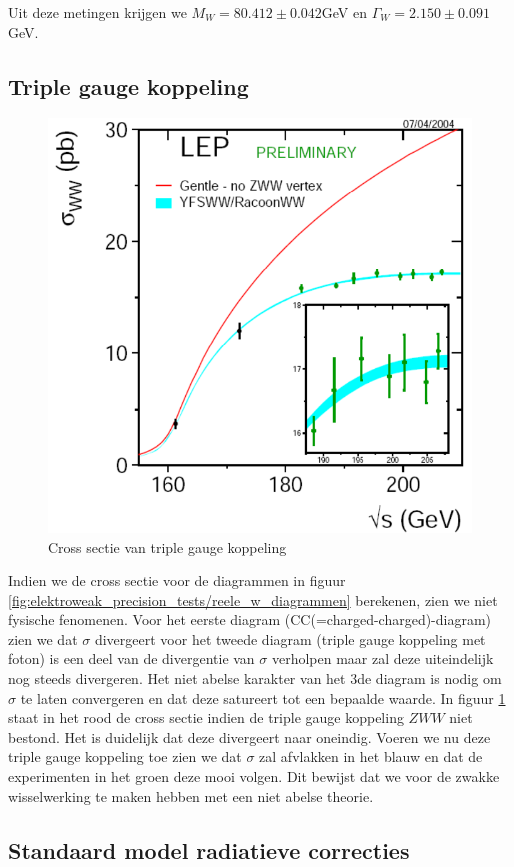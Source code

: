 \documentclass[../main.tex]{subfiles}
\begin{document}
Uit deze metingen krijgen we $M_W = 80.412 \pm 0.042$GeV en $\Gamma_W = 2.150 \pm 0.091$GeV.

\subsection{Triple gauge koppeling}%
\label{sub:triple_gauge_koppeling}

\begin{figure}[h]
    \centering
    \includegraphics[width=0.4\linewidth]{elektroweak_precision_tests/w_sigma_sat.png}
    \caption{Cross sectie van triple gauge koppeling}%
    \label{fig:elektroweak_precision_tests/w_sigma_sat}
\end{figure}

Indien we de cross sectie voor de diagrammen in figuur \ref{fig:elektroweak_precision_tests/reele_w_diagrammen} berekenen, zien we niet fysische fenomenen. Voor het eerste diagram (CC(=charged-charged)-diagram) zien we dat $\sigma$ divergeert voor het tweede diagram (triple gauge koppeling met foton) is een deel van de divergentie van $\sigma$ verholpen maar zal deze uiteindelijk nog steeds divergeren. Het niet abelse karakter van het 3de diagram is nodig om $\sigma$ te laten convergeren en dat deze satureert tot een bepaalde waarde. In figuur \ref{fig:elektroweak_precision_tests/w_sigma_sat} staat in het rood de cross sectie indien de triple gauge koppeling $ZWW$ niet bestond. Het is duidelijk dat deze divergeert naar oneindig. Voeren we nu deze triple gauge koppeling toe zien we dat $\sigma$ zal afvlakken in het blauw en dat de experimenten in het groen deze mooi volgen. Dit bewijst dat we voor de zwakke wisselwerking te maken hebben met een niet abelse theorie.

\subsection{Standaard model radiatieve correcties}%
\label{sub:sm_radiatieve_correcties}
\end{document}
